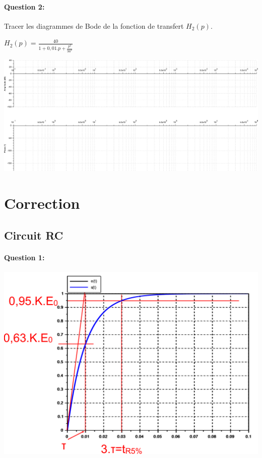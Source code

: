 \paragraph{Question 2:} Tracer les diagrammes de Bode de la fonction de transfert $H_2(p)$.

\begin{center}
$H_2(p)=\frac{40}{1+0,01.p+\frac{p^2}{90^2}}$
\end{center}

\begin{center}
 \includegraphics[width=0.9\linewidth]{img/BodeH2}
\end{center}

\ifdef{\public}{}{}

\newpage

\pagestyle{correction}

\section{Correction}

\subsection{Circuit RC}

\paragraph{Question 1:}

\begin{center}
 \includegraphics[width=0.7\linewidth]{img/exo_1_cor}
\end{center}

